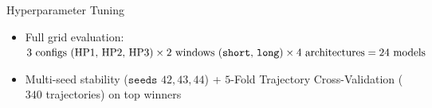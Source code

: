 \documentclass[aspectratio=169,10pt]{beamer}
\begin{document}
\begin{frame}{Hyperparameter Tuning}
    \begin{itemize}\setlength{\itemsep}{4pt}
        \item \fontsize{9.2}{12.5}\selectfont Full grid evaluation: $3\text{ configs (HP1, HP2, HP3)} \times 2\text{ windows (\texttt{short}, \texttt{long})} \times 4\text{ architectures} = 24\text{ models}$
        \item Multi-seed stability ($\texttt{seeds } 42, 43, 44$) + $5$-Fold Trajectory Cross-Validation ($340$ trajectories) on top winners
    \end{itemize}


\end{frame}
\end{document}
